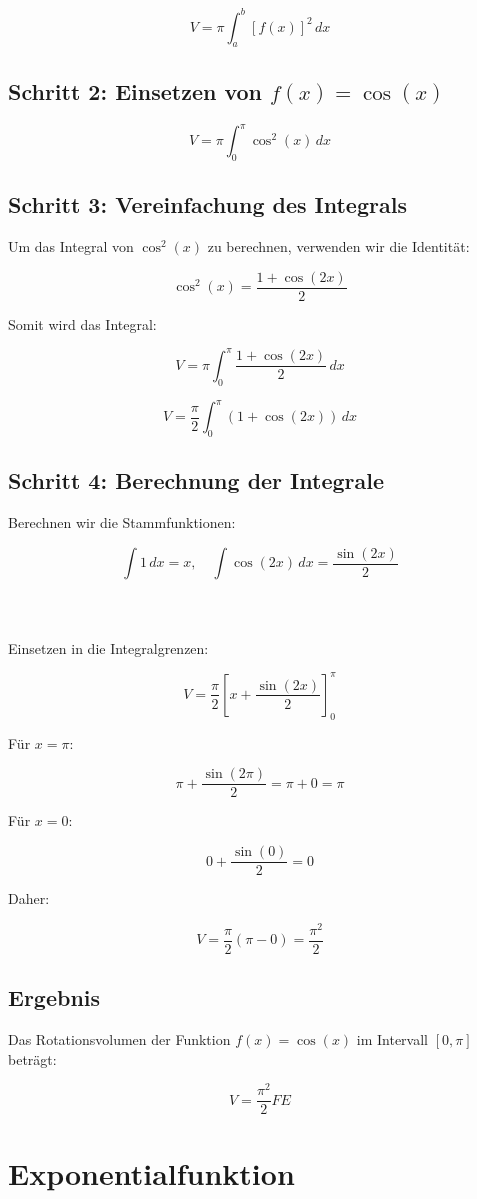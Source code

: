 \documentclass[a4paper,final]{report}
\begin{document}
\[
V = \pi \int_a^b [f(x)]^2 \, dx
\]

\subsection{Schritt 2: Einsetzen von \( f(x) = \cos(x) \)}
\[
V = \pi \int_0^\pi \cos^2(x) \, dx
\]

\subsection{Schritt 3: Vereinfachung des Integrals}
Um das Integral von \( \cos^2(x) \) zu berechnen, verwenden wir die Identität:

\[
\cos^2(x) = \frac{1 + \cos(2x)}{2}
\]

Somit wird das Integral:

\[
V = \pi \int_0^\pi \frac{1 + \cos(2x)}{2} \, dx
\]

\[
V = \frac{\pi}{2} \int_0^\pi (1 + \cos(2x)) \, dx
\]

\subsection{Schritt 4: Berechnung der Integrale}
Berechnen wir die Stammfunktionen:

\[
\int 1 \, dx = x, \quad \int \cos(2x) \, dx = \frac{\sin(2x)}{2}
\]
\\
\\
\\
Einsetzen in die Integralgrenzen:

\[
V = \frac{\pi}{2} \left[ x + \frac{\sin(2x)}{2} \right]_0^\pi
\]

Für \( x = \pi \):

\[
\pi + \frac{\sin(2\pi)}{2} = \pi + 0 = \pi
\]

Für \( x = 0 \):

\[
0 + \frac{\sin(0)}{2} = 0
\]

Daher:

\[
V = \frac{\pi}{2} (\pi - 0) = \frac{\pi^2}{2}
\]

\subsection{Ergebnis}
Das Rotationsvolumen der Funktion \( f(x) = \cos(x) \) im Intervall \( [0, \pi] \) beträgt:

\[
V = \frac{\pi^2}{2} FE
\]
\cite{lambacher_schweizer}
\section{Exponentialfunktion}
\end{document}
